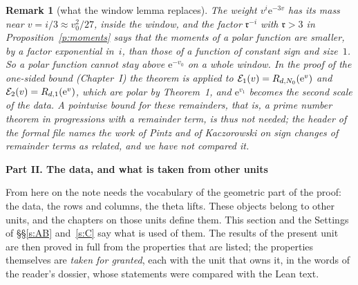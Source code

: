 \documentclass[11pt,a4paper]{article}
\newcommand{\sect}[2]{\refstepcounter{section}\label{#2}\par\addvspace{19pt plus 4pt minus 2pt}\Needspace{7\baselineskip}%
  \noindent\llap{{\fontsize{13.2}{16}\selectfont\bfseries\color{inkfaint}\thesection}\hspace{9pt}}%
  {\fontsize{13.2}{16}\selectfont\bfseries\color{ink}#1}\par\nopagebreak\vspace{-1pt}}
\theoremstyle{plainx}
\theoremstyle{uprightx}
\newtheorem{remark}[theorem]{Remark}
\newcommand{\ee}{\mathrm{e}}
\newcommand{\cE}{\mathcal{E}}
\newcommand{\rr}{\mathfrak{r}}
\begin{document}
\begin{remark}[what the window lemma replaces]\label{r:window}
The weight $v^{i}\ee^{-3v}$ has its mass near $v=i/3\approx v_0^{2}/27$, inside the window, and the factor
$\rr^{-i}$ with $\rr>3$ in Proposition~\ref{p:moments} says that the moments of a polar function are smaller, by a
factor exponential in~$i$, than those of a function of constant sign and size~$1$. So a polar function cannot stay
above $\ee^{-v_0}$ on a whole window. In the proof of the one-sided bound (Chapter~I) the theorem is applied to
$\cE_1(v)=\primeError{d}{N_0}{\ee^{v}}$ and $\cE_2(v)=\primeError{d}{1}{\ee^{v}}$, which are polar by Theorem~1, and
$\ee^{v_1}$ becomes the second scale of the data. A pointwise bound for these remainders, that is, a prime number
theorem in progressions with a remainder term, is thus not needed; the header of the formal file names the work of
Pintz and of Kaczorowski on sign changes of remainder terms as related, and we have not compared it.
\end{remark}

\sect{Part II. The data, and what is taken from other units}{s:data}
From here on the note needs the vocabulary of the geometric part of the proof: the data, the rows and columns, the
theta lifts. These objects belong to other units, and the chapters on those units define them. This section and the
Settings of §§\ref{s:AB} and~\ref{s:C} say what is used of them. The results of the present unit are then proved in
full from the properties that are listed; the properties themselves are \emph{taken for granted}, each with the unit
that owns it, in the words of the reader's dossier, whose statements were compared with the Lean text.
\end{document}
